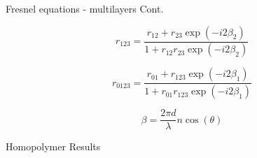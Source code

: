 \documentclass[10pt]{beamer}
\begin{document}
	\begin{frame}{Fresnel equations - multilayers Cont.}
	
	\begin{minipage}{0.47\textwidth}
	\begin{equation*}
	r_{123}= \frac{r_{12}+r_{23}\exp(-i2\beta_2)}{1+r_{12}r_{23}\exp(-i2\beta_2)}
	\end{equation*}
	
	\begin{equation*}
	r_{0123}= \frac{r_{01}+r_{123}\exp(-i2\beta_1)}{1+r_{01}r_{123}\exp(-i2\beta_1)}
	\end{equation*}
	\end{minipage}
	\begin{minipage}{0.5\textwidth}
		\begin{equation*}
		\beta=\frac{2\pi d}{\lambda} n\cos(\theta)
		\end{equation*}
	\end{minipage}
	\end{frame}
	
	\begin{frame}{Homopolymer Results}
	
	\end{frame}
\end{document}
